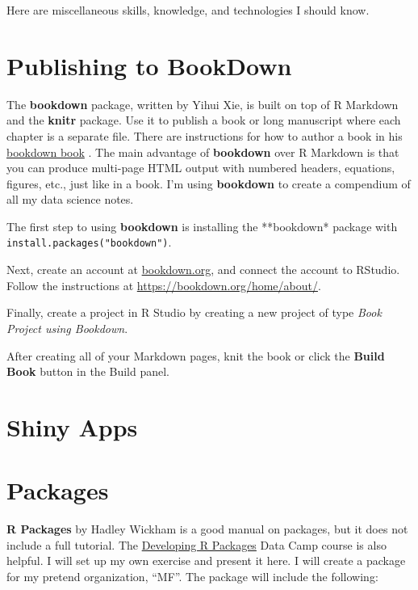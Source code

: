 \documentclass[
]{book}
\begin{document}
Here are miscellaneous skills, knowledge, and technologies I should know.

\hypertarget{publishing-to-bookdown}{%
\section*{Publishing to BookDown}\label{publishing-to-bookdown}}

The \textbf{bookdown} package, written by Yihui Xie, is built on top of R Markdown and the \textbf{knitr} package. Use it to publish a book or long manuscript where each chapter is a separate file. There are instructions for how to author a book in his \href{https://bookdown.org/yihui/bookdown/}{bookdown book} \citep{xie2019}. The main advantage of \textbf{bookdown} over R Markdown is that you can produce multi-page HTML output with numbered headers, equations, figures, etc., just like in a book. I'm using \textbf{bookdown} to create a compendium of all my data science notes.

The first step to using \textbf{bookdown} is installing the **bookdown* package with \texttt{install.packages("bookdown")}.

Next, create an account at \href{http://bookdown.org}{bookdown.org}, and connect the account to RStudio. Follow the instructions at \url{https://bookdown.org/home/about/}.

Finally, create a project in R Studio by creating a new project of type \emph{Book Project using Bookdown}.

After creating all of your Markdown pages, knit the book or click the \textbf{Build Book} button in the Build panel.

\hypertarget{shiny-apps}{%
\section*{Shiny Apps}\label{shiny-apps}}

\hypertarget{packages}{%
\section*{Packages}\label{packages}}

\textbf{R Packages} \citep{Wickham2015} by Hadley Wickham is a good manual on packages, but it does not include a full tutorial. The \href{https://campus.datacamp.com/courses/developing-r-packages/}{Developing R Packages} Data Camp course is also helpful. I will set up my own exercise and present it here. I will create a package for my pretend organization, ``MF''. The package will include the following:
\end{document}
